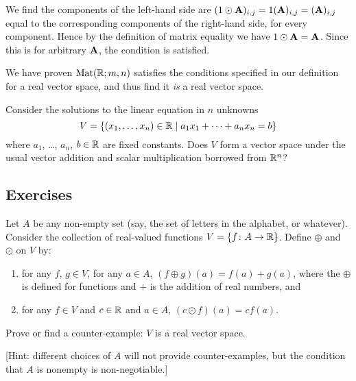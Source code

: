 \begin{example}
\begin{enumerate}[label=(\arabic*)]
  We find the components of the left-hand side are
  $(1\odot\mathbf{A})_{i,j} = 1(\mathbf{A})_{i,j} = (\mathbf{A})_{i,j}$ equal to
  the corresponding components of the right-hand side, for every
  component. Hence by the definition of matrix equality we have
  $1\odot\mathbf{A}=\mathbf{A}$.
  Since this is for arbitrary $\mathbf{A}$, the condition is satisfied.
\end{enumerate}
We have proven $\mathrm{Mat}(\mathbb{R};m,n)$ satisfies the conditions specified in our
definition for a real vector space, and thus find it \emph{is} a real
vector space.
\end{example}

\label{puzzle:vector-spaces:solution-space}
Consider the solutions to the linear equation in $n$ unknowns
\begin{equation}
V = \{(x_{1},\dots,x_{n})\in\mathbb{R}\mid a_{1}x_{1}+\cdots+a_{n}x_{n}=b\}
\end{equation}
where $a_{1}$, \dots, $a_{n}$, $b\in\mathbb{R}$ are fixed constants.
Does $V$ form a vector space under the usual vector addition and scalar
multiplication borrowed from $\mathbb{R}^{n}$?

\subsection*{Exercises}

\begin{exercise}
Let $A$ be any non-empty set (say, the set of letters in the alphabet,
or whatever). Consider the collection of real-valued functions
$V=\{f\colon A\to\mathbb{R}\}$. Define $\oplus$ and $\odot$ on $V$ by:
\begin{enumerate}
\item for any $f$, $g\in V$, for any $a\in A$, $(f\oplus g)(a) = f(a) + g(a)$,
where the $\oplus$ is defined for functions and $+$ is the addition of
real numbers, and
\item for any $f\in V$ and $c\in\mathbb{R}$ and $a\in A$, $(c\odot f)(a)=cf(a)$.
\end{enumerate}
Prove or find a counter-example: $V$ is a real vector space.

[Hint: different choices of $A$ will not provide counter-examples, but
  the condition that $A$ is nonempty is non-negotiable.]
\end{exercise}


